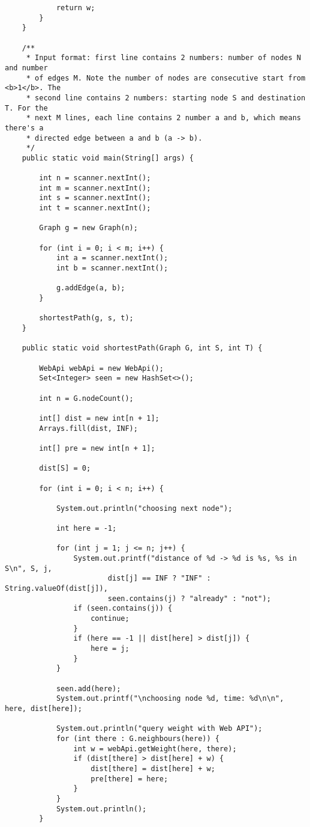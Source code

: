 \documentclass[14pt, a4paper]{article}
\begin{document}
\begin{verbatim}
            return w;
        }
    }

    /**
     * Input format: first line contains 2 numbers: number of nodes N and number
     * of edges M. Note the number of nodes are consecutive start from <b>1</b>. The
     * second line contains 2 numbers: starting node S and destination T. For the
     * next M lines, each line contains 2 number a and b, which means there's a
     * directed edge between a and b (a -> b).
     */
    public static void main(String[] args) {

        int n = scanner.nextInt();
        int m = scanner.nextInt();
        int s = scanner.nextInt();
        int t = scanner.nextInt();

        Graph g = new Graph(n);

        for (int i = 0; i < m; i++) {
            int a = scanner.nextInt();
            int b = scanner.nextInt();

            g.addEdge(a, b);
        }

        shortestPath(g, s, t);
    }

    public static void shortestPath(Graph G, int S, int T) {

        WebApi webApi = new WebApi();
        Set<Integer> seen = new HashSet<>();

        int n = G.nodeCount();

        int[] dist = new int[n + 1];
        Arrays.fill(dist, INF);

        int[] pre = new int[n + 1];

        dist[S] = 0;

        for (int i = 0; i < n; i++) {

            System.out.println("choosing next node");

            int here = -1;

            for (int j = 1; j <= n; j++) {
                System.out.printf("distance of %d -> %d is %s, %s in S\n", S, j,
                        dist[j] == INF ? "INF" : String.valueOf(dist[j]), 
                        seen.contains(j) ? "already" : "not");
                if (seen.contains(j)) {
                    continue;
                }
                if (here == -1 || dist[here] > dist[j]) {
                    here = j;
                }
            }

            seen.add(here);
            System.out.printf("\nchoosing node %d, time: %d\n\n", here, dist[here]);

            System.out.println("query weight with Web API");
            for (int there : G.neighbours(here)) {
                int w = webApi.getWeight(here, there);
                if (dist[there] > dist[here] + w) {
                    dist[there] = dist[here] + w;
                    pre[there] = here;
                }
            }
            System.out.println();
        }


\end{verbatim}
\end{document}
